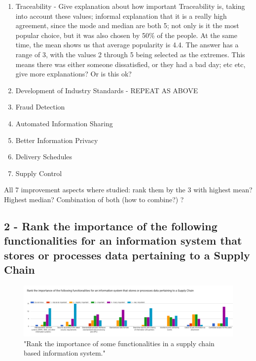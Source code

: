 
\begin{enumerate}
    \item Traceability - Give explanation about how important Traceability is, taking into account these values; informal explanation that it is a really high agreement, since the mode and median are both 5; not only is it the most popular choice, but it was also chosen by 50\% of the people. At the same time, the mean shows us that average popularity is 4.4. The answer has a range of 3, with the values 2 through 5 being selected as the extremes. This means there was either someone dissatisfied, or they had a bad day; etc etc, give more explanations? Or is this ok?
    \item Development of Industry Standards - REPEAT AS ABOVE
    \item Fraud Detection
    \item Automated Information Sharing
    \item Better Information Privacy
    \item Delivery Schedules
    \item Supply Control
\end{enumerate}
    
    All 7 improvement aspects where studied: rank them by the 3 with highest mean? Highest median? Combination of both (how to combine?)  ?

\subsection*{2 - Rank the importance of the following functionalities for an information system that stores or processes data pertaining to a Supply Chain}

\begin{figure}[h]
\centering
\includegraphics[scale=0.28]{media/importance_SC_info_systems.png}
\caption["Rank the importance of some functionalities in a supply chain based information system."]{"Rank the importance of some functionalities in a supply chain based information system."}
\label{fig:importance_SC_info_systems}
\end{figure}

